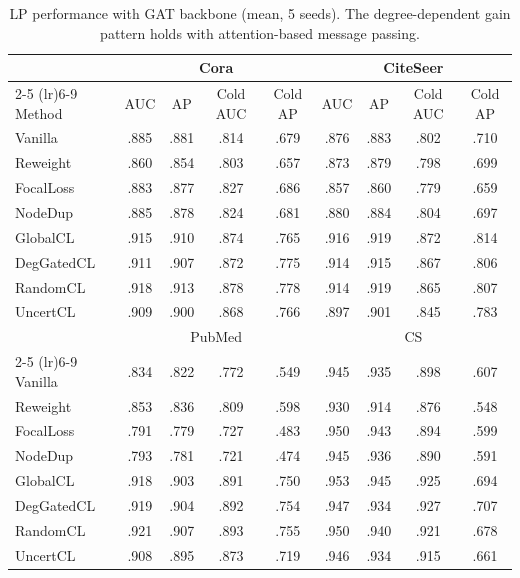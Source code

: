 \begin{table}[h]
\centering
\small
\caption{LP performance with GAT backbone (mean, 5 seeds). The degree-dependent gain pattern holds with attention-based message passing.}
\label{tab:main_gat}
\begin{tabular}{l cccc cccc}
\toprule
& \multicolumn{4}{c}{Cora} & \multicolumn{4}{c}{CiteSeer} \\
\cmidrule(lr){2-5} \cmidrule(lr){6-9}
Method & AUC & AP & Cold AUC & Cold AP & AUC & AP & Cold AUC & Cold AP \\
\midrule
Vanilla & .885 & .881 & .814 & .679 & .876 & .883 & .802 & .710 \\
Reweight & .860 & .854 & .803 & .657 & .873 & .879 & .798 & .699 \\
FocalLoss & .883 & .877 & .827 & .686 & .857 & .860 & .779 & .659 \\
NodeDup & .885 & .878 & .824 & .681 & .880 & .884 & .804 & .697 \\
GlobalCL & .915 & .910 & .874 & .765 & .916 & .919 & .872 & .814 \\
DegGatedCL & .911 & .907 & .872 & .775 & .914 & .915 & .867 & .806 \\
RandomCL & .918 & .913 & .878 & .778 & .914 & .919 & .865 & .807 \\
UncertCL & .909 & .900 & .868 & .766 & .897 & .901 & .845 & .783 \\
\midrule
& \multicolumn{4}{c}{PubMed} & \multicolumn{4}{c}{CS} \\
\cmidrule(lr){2-5} \cmidrule(lr){6-9}
Vanilla & .834 & .822 & .772 & .549 & .945 & .935 & .898 & .607 \\
Reweight & .853 & .836 & .809 & .598 & .930 & .914 & .876 & .548 \\
FocalLoss & .791 & .779 & .727 & .483 & .950 & .943 & .894 & .599 \\
NodeDup & .793 & .781 & .721 & .474 & .945 & .936 & .890 & .591 \\
GlobalCL & .918 & .903 & .891 & .750 & .953 & .945 & .925 & .694 \\
DegGatedCL & .919 & .904 & .892 & .754 & .947 & .934 & .927 & .707 \\
RandomCL & .921 & .907 & .893 & .755 & .950 & .940 & .921 & .678 \\
UncertCL & .908 & .895 & .873 & .719 & .946 & .934 & .915 & .661 \\
\bottomrule
\end{tabular}
\end{table}
